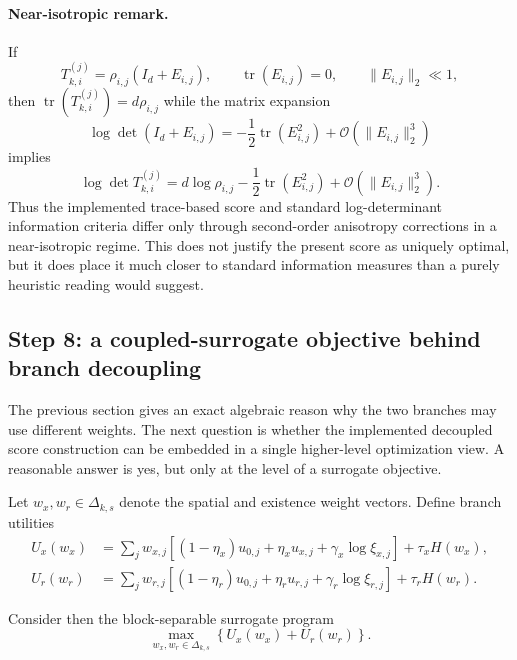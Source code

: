 \paragraph{Near-isotropic remark.}
If
\begin{equation}
T_{k,i}^{(j)} = \rho_{i,j}\left(I_d + E_{i,j}\right),
\qquad
\operatorname{tr}(E_{i,j})=0,
\qquad
\|E_{i,j}\|_2 \ll 1,
\end{equation}
then $\operatorname{tr}(T_{k,i}^{(j)}) = d\rho_{i,j}$ while the matrix expansion
\begin{equation}
\log\det\!\left(I_d + E_{i,j}\right)
=
-\frac{1}{2}\operatorname{tr}(E_{i,j}^2) + \mathcal{O}\!\left(\|E_{i,j}\|_2^3\right)
\end{equation}
implies
\begin{equation}
\log\det T_{k,i}^{(j)}
=
d\log \rho_{i,j}
-\frac{1}{2}\operatorname{tr}(E_{i,j}^2)
+ \mathcal{O}\!\left(\|E_{i,j}\|_2^3\right).
\end{equation}
Thus the implemented trace-based score and standard log-determinant information criteria differ only through second-order anisotropy corrections in a near-isotropic regime. This does not justify the present score as uniquely optimal, but it does place it much closer to standard information measures than a purely heuristic reading would suggest.

\subsection*{Step 8: a coupled-surrogate objective behind branch decoupling}

The previous section gives an exact algebraic reason why the two branches may use different weights. The next question is whether the implemented decoupled score construction can be embedded in a single higher-level optimization view. A reasonable answer is yes, but only at the level of a surrogate objective.

Let $w_x, w_r \in \Delta_{k,s}$ denote the spatial and existence weight vectors. Define branch utilities
\begin{align}
U_x(w_x)
&=
\sum_j w_{x,j}\left[(1-\eta_x)u_{0,j} + \eta_x u_{x,j} + \gamma_x \log \xi_{x,j}\right]
+
\tau_x H(w_x), \\
U_r(w_r)
&=
\sum_j w_{r,j}\left[(1-\eta_r)u_{0,j} + \eta_r u_{r,j} + \gamma_r \log \xi_{r,j}\right]
+
\tau_r H(w_r).
\end{align}

Consider then the block-separable surrogate program
\begin{equation}
\max_{w_x,w_r \in \Delta_{k,s}}
\left\{
U_x(w_x) + U_r(w_r)
\right\}.
\label{eq:block-separable-surrogate}
\end{equation}

